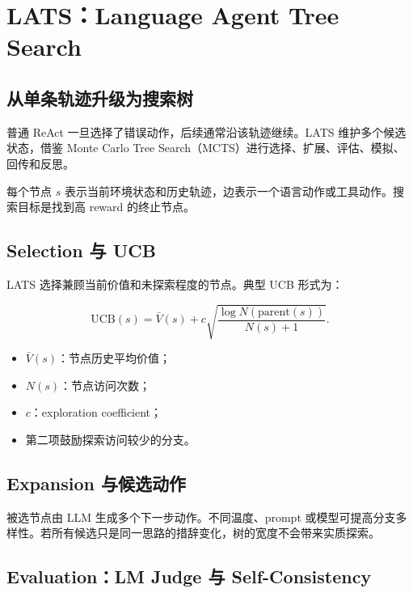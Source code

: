 \section{LATS：Language Agent Tree Search}

\subsection{从单条轨迹升级为搜索树}

普通 ReAct 一旦选择了错误动作，后续通常沿该轨迹继续。LATS 维护多个候选状态，借鉴 Monte Carlo Tree Search（MCTS）进行选择、扩展、评估、模拟、回传和反思。



每个节点 $s$ 表示当前环境状态和历史轨迹，边表示一个语言动作或工具动作。搜索目标是找到高 reward 的终止节点。

\subsection{Selection 与 UCB}

LATS 选择兼顾当前价值和未探索程度的节点。典型 UCB 形式为：

$$
\mathrm{UCB}(s)=\bar V(s)+c\sqrt{\frac{\log N(\mathrm{parent}(s))}{N(s)+1}}.
$$

\begin{itemize}
    \item $\bar V(s)$：节点历史平均价值；
    \item $N(s)$：节点访问次数；
    \item $c$：exploration coefficient；
    \item 第二项鼓励探索访问较少的分支。
\end{itemize}

\subsection{Expansion 与候选动作}

被选节点由 LLM 生成多个下一步动作。不同温度、prompt 或模型可提高分支多样性。若所有候选只是同一思路的措辞变化，树的宽度不会带来实质探索。

\subsection{Evaluation：LM Judge 与 Self-Consistency}

